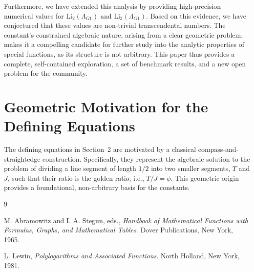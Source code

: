 \documentclass{amsart}
\theoremstyle{plain}
\theoremstyle{definition}
\theoremstyle{remark}
\newcommand{\LambdaG}{\Lambda_{G1}}
\begin{document}
Furthermore, we have extended this analysis by providing high-precision numerical values for $\mathrm{Li}_2(\LambdaG)$ and $\mathrm{Li}_3(\LambdaG)$. Based on this evidence, we have conjectured that these values are non-trivial transcendental numbers. The constant's constrained algebraic nature, arising from a clear geometric problem, makes it a compelling candidate for further study into the analytic properties of special functions, as its structure is not arbitrary. This paper thus provides a complete, self-contained exploration, a set of benchmark results, and a new open problem for the community.

\appendix
\section{Geometric Motivation for the Defining Equations}
\label{app:A}
The defining equations in Section~2 are motivated by a classical compass-and-straightedge construction. Specifically, they represent the algebraic solution to the problem of dividing a line segment of length $1/2$ into two smaller segments, $T$ and $J$, such that their ratio is the golden ratio, i.e., $T/J = \phi$. This geometric origin provides a foundational, non-arbitrary basis for the constants.

\begin{thebibliography}{9}

M. Abramowitz and I. A. Stegun, eds.,
\textit{Handbook of Mathematical Functions with Formulas, Graphs, and Mathematical Tables}.
Dover Publications, New York, 1965.

L. Lewin,
\textit{Polylogarithms and Associated Functions}.
North Holland, New York, 1981.

\end{thebibliography}
\end{document}
